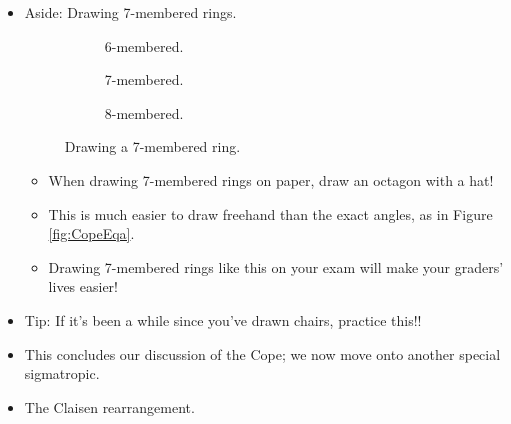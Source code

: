 \documentclass[../notes.tex]{subfiles}
\begin{document}
\begin{itemize}
\begin{enumerate}
\begin{itemize}
        \end{itemize}
    \end{enumerate}
    \pagebreak
    \item Aside: Drawing 7-membered rings.
    \begin{figure}[h!]
        \centering
        \footnotesize
        \begin{subfigure}[b]{0.2\linewidth}
            \centering
            \caption{6-membered.}
            \label{fig:7memberRinga}
        \end{subfigure}
        \begin{subfigure}[b]{0.2\linewidth}
            \centering
            \caption{7-membered.}
            \label{fig:7memberRingb}
        \end{subfigure}
        \begin{subfigure}[b]{0.2\linewidth}
            \centering
            \caption{8-membered.}
            \label{fig:7memberRingc}
        \end{subfigure}
        \caption{Drawing a 7-membered ring.}
        \label{fig:7memberRing}
    \end{figure}
    \begin{itemize}
        \item When drawing 7-membered rings on paper, draw an octagon with a hat!
        \item This is much easier to draw freehand than the exact angles, as in Figure \ref{fig:CopeEqa}.
        \item Drawing 7-membered rings like this on your exam will make your graders' lives easier!
    \end{itemize}
    \item Tip: If it's been a while since you've drawn chairs, practice this!!
    \item This concludes our discussion of the Cope; we now move onto another special sigmatropic.
    \item The Claisen rearrangement.
    \begin{itemize}

\end{itemize}
\end{itemize}
\end{document}
